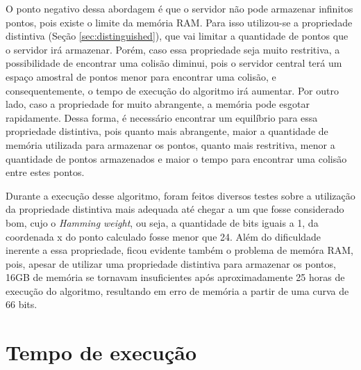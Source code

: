 O ponto negativo dessa abordagem é que o servidor não pode armazenar infinitos pontos, pois existe o limite da memória RAM. Para isso utilizou-se a propriedade distintiva (Seção \ref{sec:distinguished}), que vai limitar a quantidade de pontos que o servidor irá armazenar. Porém, caso essa propriedade seja muito restritiva, a possibilidade de encontrar uma colisão diminui, pois o servidor central terá um espaço amostral de pontos menor para encontrar uma colisão, e consequentemente, o tempo de execução do algoritmo irá aumentar. Por outro lado, caso a propriedade for muito abrangente, a memória pode esgotar rapidamente. Dessa forma, é necessário encontrar um equilíbrio para essa propriedade distintiva, pois quanto mais abrangente, maior a quantidade de memória utilizada para armazenar os pontos, quanto mais restritiva, menor a quantidade de pontos armazenados e maior o tempo para encontrar uma colisão entre estes pontos.

Durante a execução desse algoritmo, foram feitos diversos testes sobre a utilização da propriedade distintiva mais adequada até chegar a um que fosse considerado bom, cujo o \textit{Hamming weight}, ou seja, a quantidade de bits iguais a 1, da coordenada x do ponto calculado fosse menor que 24. Além do dificuldade inerente a essa propriedade, ficou evidente também o problema de memóra RAM, pois, apesar de utilizar uma propriedade distintiva para armazenar os pontos, 16GB de memória se tornavam insuficientes após aproximadamente 25 horas de execução do algoritmo, resultando em erro de memória a partir de uma curva de 66 bits.

\section{Tempo de execução}
\label{sec:execution_time}

